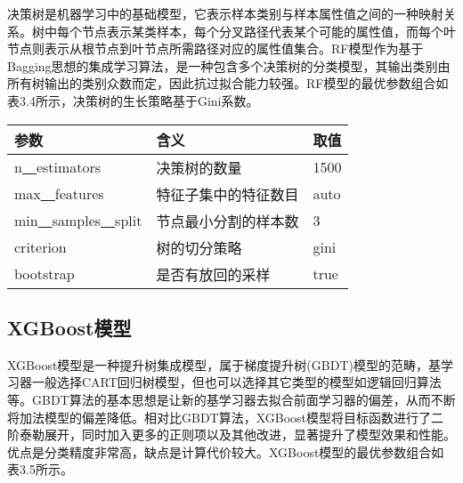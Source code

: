 决策树是机器学习中的基础模型，它表示样本类别与样本属性值之间的一种映射关系。树中每个节点表示某类样本，每个分叉路径代表某个可能的属性值，而每个叶节点则表示从根节点到叶节点所需路径对应的属性值集合。RF模型作为基于Bagging思想的集成学习算法，是一种包含多个决策树的分类模型，其输出类别由所有树输出的类别众数而定，因此抗过拟合能力较强。RF模型的最优参数组合如表3.4所示，决策树的生长策略基于Gini系数。

\begin{table}[!h] 
    \centering
    \footnotesize
    \setlength{\tabcolsep}{20pt}
    \renewcommand{\arraystretch}{1}
\begin{tabular}{lll}
\toprule
参数 & 含义 & 取值 \\ \hline
n\underline{~~}estimators & 决策树的数量 & 1500 \\ 
max\underline{~~}features & 特征子集中的特征数目 & auto \\ 
min\underline{~~}samples\underline{~~}split & 节点最小分割的样本数 & 3 \\
criterion & 树的切分策略 & gini\\ 
bootstrap & 是否有放回的采样 & true\\ 
\bottomrule
\end{tabular}
\end{table}

\subsection{XGBoost模型}
XGBoost模型是一种提升树集成模型，属于梯度提升树(GBDT)模型的范畴，基学习器一般选择CART回归树模型，但也可以选择其它类型的模型如逻辑回归算法等。GBDT算法的基本思想是让新的基学习器去拟合前面学习器的偏差，从而不断将加法模型的偏差降低。相对比GBDT算法，XGBoost模型将目标函数进行了二阶泰勒展开，同时加入更多的正则项以及其他改进，显著提升了模型效果和性能。优点是分类精度非常高，缺点是计算代价较大。XGBoost模型的最优参数组合如表3.5所示。

